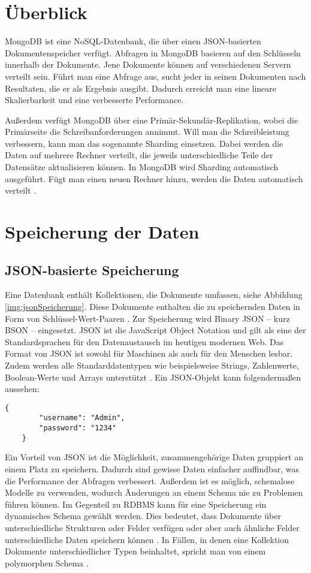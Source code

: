 \section{Überblick}
MongoDB ist eine NoSQL-Datenbank, die über einen JSON-basierten Dokumentenspeicher verfügt. Abfragen in MongoDB basieren auf den Schlüsseln innerhalb der Dokumente. Jene Dokumente können auf verschiedenen Servern verteilt sein. Führt man eine Abfrage aus, sucht jeder in seinen Dokumenten nach Resultaten, die er als Ergebnis ausgibt. Dadurch erreicht man eine lineare Skalierbarkeit und eine verbesserte Performance. 

Außerdem verfügt MongoDB über eine Primär-Sekundär-Replikation, wobei die Primärseite die Schreibanforderungen annimmt. Will man die Schreibleistung verbessern, kann man das sogenannte Sharding einsetzen. Dabei werden die Daten auf mehrere Rechner verteilt, die jeweils unterschiedliche Teile der Datensätze aktualisieren können. In MongoDB wird Sharding automatisch ausgeführt. Fügt man einen neuen Rechner hinzu, werden die Daten automatisch verteilt \cite[S.26]{zwei}.

\section{Speicherung der Daten}
\subsection{JSON-basierte Speicherung}
Eine Datenbank enthält Kollektionen, die Dokumente umfassen, siehe Abbildung \ref*{img:jsonSpeicherung}. Diese Dokumente enthalten die zu speichernden Daten \cite[S.30]{zwei} in Form von Schlüssel-Wert-Paaren \cite[S.27]{zwei}. Zur Speicherung wird Binary JSON – kurz BSON – eingesetzt. JSON ist die JavaScript Object Notation und gilt als eine der Standardsprachen für den Datenaustausch im heutigen modernen Web. Das Format von JSON ist sowohl für Maschinen als auch für den Menschen lesbar. Zudem werden alle Standarddatentypen wie beispielsweise Strings, Zahlenwerte, Boolean-Werte und Arrays unterstützt \cite[S.31]{zwei}. Ein JSON-Objekt kann folgendermaßen aussehen:

\begin{lstlisting}[caption=JSON-Objekt, label=lst:jsonobjekt,float=!htb]
    {
        "username": "Admin",
        "password": "1234"
    }
\end{lstlisting}

Ein Vorteil von JSON ist die Möglichkeit, zusammengehörige Daten gruppiert an einem Platz zu speichern. Dadurch sind gewisse Daten einfacher auffindbar, was die Performance der Abfragen verbessert. Außerdem ist es möglich, schemalose Modelle zu verwenden, wodurch Änderungen an einem Schema nie zu Problemen führen können.
Im Gegenteil zu RDBMS kann für eine Speicherung ein dynamisches Schema gewählt werden. Dies bedeutet, dass Dokumente über unterschiedliche Strukturen oder Felder verfügen oder aber auch ähnliche Felder unterschiedliche Daten speichern können \cite[S.26f.]{zwei}. In Fällen, in denen eine Kollektion Dokumente unterschiedlicher Typen beinhaltet, spricht man von einem polymorphen Schema \cite[S.32]{zwei}.

